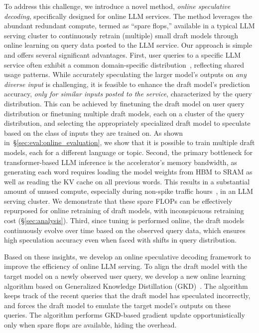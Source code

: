 To address this challenge, we introduce a novel method, \emph{online speculative decoding}, specifically designed for online LLM services.
The method leverages the abundant redundant compute, termed as ``spare flops,'' available in a typical LLM serving cluster to continuously retrain (multiple) small draft models through online learning on query data posted to the LLM service. Our approach is simple and offers several significant advantages.
First, user queries to a specific LLM service often exhibit a common domain-specific distribution~\citep{zheng2023lmsys}, reflecting shared usage patterns.
While accurately speculating the larger model's outputs on \emph{any diverse input} is challenging, it is feasible to enhance the draft model's prediction accuracy, \emph{only for similar inputs posted to the service}, characterized by the query distribution. This can be achieved by finetuning the draft model on user query distribution or finetuning multiple draft models, each on a cluster of the query distribution, and selecting the appropriately specialized draft model to speculate based on the class of inputs they are trained on. As shown in~\S\ref{sec:eval:online_evaluation}, we show that it is possible to train multiple draft models, each for a different language or topic. 
Second, the primary bottleneck for transformer-based LLM inference is the accelerator's memory bandwidth, as generating each word requires loading the model weights from HBM to SRAM as well as reading the KV cache on all previous words. 
This results in a substantial amount of unused compute, especially during non-spike traffic hours~\citep{spector2023accelerating,chen2023accelerating,kwon2023efficient}, in an LLM serving cluster. We demonstrate that these spare FLOPs can be effectively repurposed for online retraining of draft models, with inconspicuous retraining cost (\S\ref{sec:analysis}).
Third, since tuning is performed online, the draft models continuously evolve over time based on the observed query data, which ensures high speculation accuracy even when faced with shifts in query distribution.






Based on these insights, we develop an online speculative decoding framework to improve the efficiency of online LLM serving. 
To align the draft model with the target model on a newly observed user query, we develop a new online learning algorithm based on Generalized Knowledge Distillation (GKD)~\citep{gu2023knowledge,agarwal2023gkd}. The algorithm keeps track of the recent queries that the draft model has speculated incorrectly, and forces the draft model to emulate the target model's outputs on these queries. The algorithm performs GKD-based gradient update opportunistically only when spare flops are available, hiding the overhead. 

